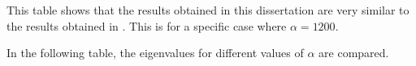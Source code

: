 	This table shows that the results obtained in this dissertation are very similar to the results obtained in \cite{LVV09}. This is for a specific case where $\alpha = 1200$.

	In the following table, the eigenvalues for different values of $\alpha$ are compared.

